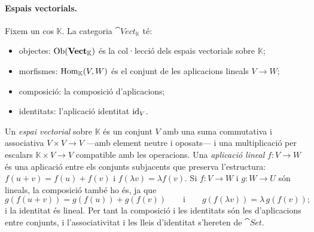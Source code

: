 \paragraph{Espais vectorials.}
Fixem un cos $\mathbb{K}$. La categoria $\cat{Vect}_{\mathbb K}$ té:
\begin{itemize}
\item objectes: $\operatorname{Ob}(\mathbf{Vect}_{\mathbb K})$ és la col·lecció dels espais vectorials sobre $\mathbb{K}$;
\item morfismes: $\operatorname{Hom}_{\mathbb K}(V,W)$ és el conjunt de les aplicacions lineals $V\to W$;
\item composició: la composició d'aplicacions;
\item identitats: l'aplicació identitat $\operatorname{id}_V$.
\end{itemize}
Un \emph{espai vectorial} sobre $\mathbb{K}$ és un conjunt $V$ amb una suma commutativa i associativa $V\times V\to V$ ---amb element neutre i oposats--- i una multiplicació per escalars $\mathbb{K}\times V\to V$ compatible amb les operacions. Una \emph{aplicació lineal} $f\colon V\to W$ és una aplicació entre els conjunts subjacents que preserva l'estructura: $f(u+v)=f(u)+f(v)$ i $f(\lambda v)=\lambda f(v)$. Si $f\colon V\to W$ i $g\colon W\to U$ són lineals, la composició també ho és, ja que
\[
g(f(u+v))=g(f(u))+g(f(v))\qquad\text{i}\qquad g(f(\lambda v))=\lambda\,g(f(v));
\]
i la identitat és lineal. Per tant la composició i les identitats són les d'aplicacions entre conjunts, i l'associativitat i les lleis d'identitat s'hereten de $\cat{Set}$.

